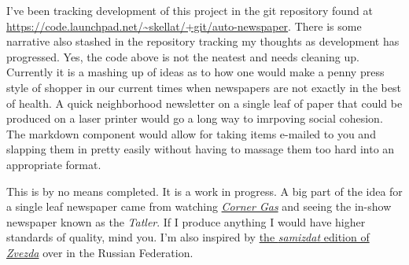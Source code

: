 I've been tracking development of this project in the git repository
found at \url{https://code.launchpad.net/~skellat/+git/auto-newspaper}.
There is some narrative also stashed in the repository tracking my
thoughts as development has progressed. Yes, the code above is not the
neatest and needs cleaning up. Currently it is a mashing up of ideas as
to how one would make a penny press style of shopper in our current
times when newspapers are not exactly in the best of health. A quick
neighborhood newsletter on a single leaf of paper that could be produced
on a laser printer would go a long way to imrpoving social cohesion. The
markdown component would allow for taking items e-mailed to you and
slapping them in pretty easily without having to massage them too hard
into an appropriate format.

This is by no means completed. It is a work in progress. A big part of
the idea for a single leaf newspaper came from watching
\href{https://en.wikipedia.org/w/index.php?title=Corner_Gas&oldid=1118823207}{\emph{Corner
Gas}} and seeing the in-show newspaper known as the \emph{Tatler}. If I
produce anything I would have higher standards of quality, mind you. I'm
also inspired by
\href{https://web.archive.org/web/20220521012308/https://www.rferl.org/a/russia-press-freedom-day-samizdat-perm-zvezda/31832108.html}{the
\emph{samizdat} edition of \emph{Zvezda}} over in the Russian
Federation.
